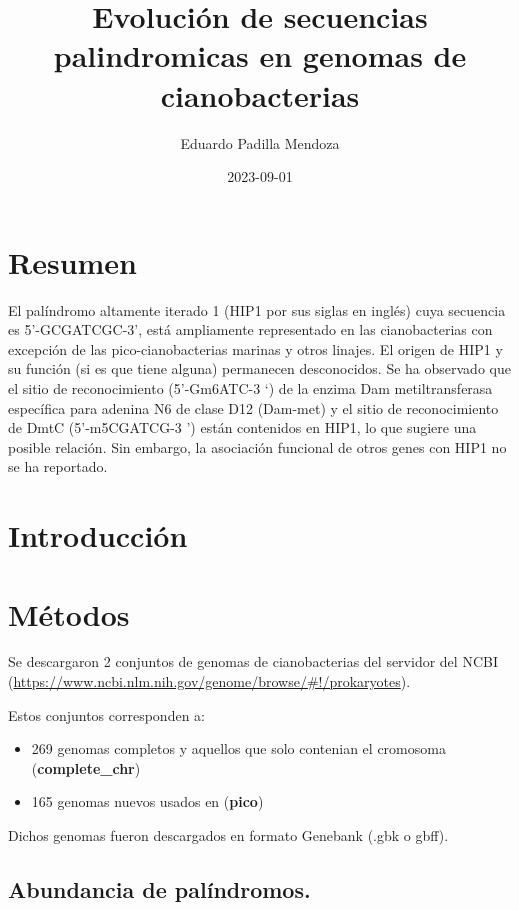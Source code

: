 \documentclass[
]{book}
\title{Evolución de secuencias palindromicas en genomas de cianobacterias}
\author{Eduardo Padilla Mendoza}
\date{2023-09-01}
\providecommand{\tightlist}{%
  \setlength{\itemsep}{0pt}\setlength{\parskip}{0pt}}
\begin{document}
\maketitle

{
\setcounter{tocdepth}{1}
\tableofcontents
}
\hypertarget{resumen}{%
\chapter*{Resumen}\label{resumen}}

El palíndromo altamente iterado 1 (HIP1 por sus siglas en inglés) cuya secuencia es 5'-GCGATCGC-3', está ampliamente representado en las cianobacterias con excepción de las pico-cianobacterias marinas y otros linajes. El origen de HIP1 y su función (si es que tiene alguna) permanecen desconocidos. Se ha observado que el sitio de reconocimiento (5'-Gm6ATC-3 `) de la enzima Dam metiltransferasa específica para adenina N6 de clase D12 (Dam-met) y el sitio de reconocimiento de DmtC (5'-m5CGATCG-3 ') están contenidos en HIP1, lo que sugiere una posible relación. Sin embargo, la asociación funcional de otros genes con HIP1 no se ha reportado.

\hypertarget{introducciuxf3n}{%
\chapter{Introducción}\label{introducciuxf3n}}

\hypertarget{muxe9todos}{%
\chapter{Métodos}\label{muxe9todos}}

Se descargaron 2 conjuntos de genomas de cianobacterias del servidor del NCBI (\url{https://www.ncbi.nlm.nih.gov/genome/browse/\#!/prokaryotes}).

Estos conjuntos corresponden a:

\begin{itemize}
\tightlist
\item
  269 genomas completos y aquellos que solo contenian el cromosoma (\textbf{complete\_chr})
\item
  165 genomas nuevos usados en \citet{cabello2022elucidating} (\textbf{pico})
\end{itemize}

Dichos genomas fueron descargados en formato Genebank (.gbk o gbff).

\hypertarget{abundancia-de-paluxedndromos.}{%
\section{Abundancia de palíndromos.}\label{abundancia-de-paluxedndromos.}}
\end{document}
